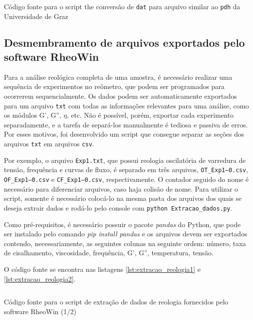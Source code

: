 \begin{apendicesenv}
\begin{listing}[H]
	\inputminted{python}{./python/LNLS_dat_to_pdh.py}
	\caption{Código fonte para o script the conversão de \texttt{dat} para arquivo similar ao \texttt{pdh} da Universidade de Graz}  %
	\label{lst:LNLS_pdh}
\end{listing}

\end{apendicesenv}

\subsection{Desmembramento de arquivos exportados pelo software RheoWin}

Para a análise reológica completa de uma amostra, é necessário realizar uma sequência de experimentos no reômetro, que podem ser programados para ocorrerem sequencialmente. Os dados podem ser automaticamente exportados para um arquivo \texttt{txt} com todas as informações relevantes para uma análise, como os módulos G', G'', $\eta$, etc. Não é possível, porém, exportar cada experimento separadamente, e a tarefa de separá-los manualmente é tediosa e passiva de erros. Por esses motivos, foi desenvolvido um script que consegue separar as seções dos arquivos \texttt{txt} em arquivos \texttt{csv}.

Por exemplo, o arquivo \texttt{Exp1.txt}, que possui reologia oscilatória de varredura de tensão, frequência e curvas de fluxo, é separado em três arquivos, \texttt{OT\_Exp1--0.csv}, \texttt{OF\_Exp1--0.csv} e \texttt{CF\_Exp1--0.csv}, respectivamente. O contador seguido do nome é necessário para diferenciar arquivos, caso haja colisão de nome. Para utilizar o script, somente é necessário colocá-lo na mesma pasta dos arquivos dos quais se deseja extrair dados e rodá-lo pelo console com \texttt{python Extracao\_dados.py}.

Como pré-requisitos, é necessário possuir o pacote \emph{pandas} do Python, que pode ser instalado pelo comando \emph{pip install pandas} e os arquivos devem ser exportados contendo, necessariamente, as seguintes colunas na seguinte ordem: número, taxa de cisalhamento, viscosidade, frequência, G', G'', temperatura, tensão.

O código fonte se encontra nas listagens \ref{lst:extracao_reologia1} e \ref{lst:extracao_reologia2}.

\begin{listing}[H]
	\inputminted{python}{./python/extracao_reologia1.py}
	\caption{Código fonte para o script de extração de dados de reologia fornecidos pelo software RheoWin (1/2)}  
	\label{lst:extracao_reologia1}
\end{listing}


